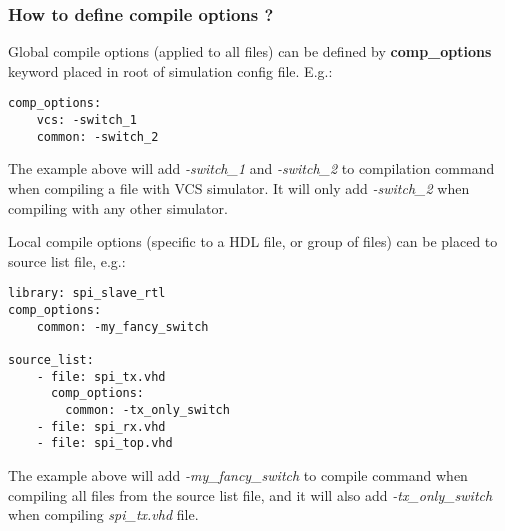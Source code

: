 \documentclass{tropic_design_spec}
\begin{document}


\subsubsection{How to define compile options ?}
\label{sec:how-to-define-compile-options}

Global compile options (applied to all files) can be defined by \textbf{comp_options} 
keyword placed in root of simulation config file. E.g.:

\begin{lstlisting}
comp_options:
    vcs: -switch_1
    common: -switch_2
\end{lstlisting}

The example above will add \textit{-switch_1} and \textit{-switch_2} to compilation
command when compiling a file with VCS simulator. It will only add \textit{-switch_2}
when compiling with any other simulator.

\vspace{3mm}

Local compile options (specific to a HDL file, or group of files) can be placed to
source list file, e.g.:

\begin{lstlisting}
library: spi_slave_rtl
comp_options:
    common: -my_fancy_switch

source_list:
    - file: spi_tx.vhd
      comp_options:
        common: -tx_only_switch
    - file: spi_rx.vhd
    - file: spi_top.vhd
\end{lstlisting}

The example above will add \textit{-my_fancy_switch} to compile command when
compiling all files from the source list file, and it will also add 
\textit{-tx_only_switch} when compiling \textit{spi_tx.vhd} file.



\end{document}
